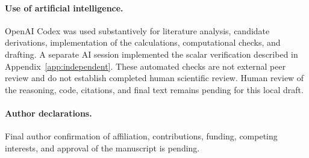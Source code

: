 \documentclass[11pt,a4paper]{article}
\theoremstyle{remark}
\numberwithin{equation}{section}
\begin{document}
\paragraph{Use of artificial intelligence.}
OpenAI Codex was used substantively for literature analysis, candidate
derivations, implementation of the calculations, computational checks,
and drafting. A separate AI session implemented the scalar verification
described in Appendix~\ref{app:independent}. These automated checks
are not external peer review and do not establish completed human
scientific review. Human review of the reasoning, code, citations, and
final text remains pending for this local draft.

\paragraph{Author declarations.}
Final author confirmation of affiliation, contributions, funding,
competing interests, and approval of the manuscript is pending.



\end{document}
